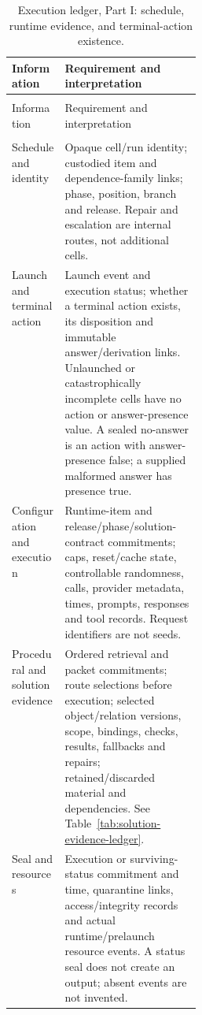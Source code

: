 \documentclass[10pt]{article} %
\providecommand{\1}{\mathbf{1}}  %
\theoremstyle{remark}
\theoremstyle{definition}
\begin{document}
\begingroup
\footnotesize
\renewcommand{\arraystretch}{1.13}
\setlength{\LTpre}{6pt}
\setlength{\LTpost}{8pt}
\setlength{\LTcapwidth}{\linewidth}
\begin{longtable}{@{}>{\raggedright\arraybackslash}p{0.28\linewidth}>{\raggedright\arraybackslash}p{}@{}}
\caption{Execution ledger, Part I: schedule, runtime evidence, and terminal-action existence.}\label{tab:execution-evaluation-ledger}\\
\toprule
Information & Requirement and interpretation \\
\midrule
\endfirsthead
\multicolumn{2}{@{}l}{\textit{Table \thetable\ continued}}\\
\toprule
Information & Requirement and interpretation \\
\midrule
\endhead
\midrule
\multicolumn{2}{r@{}}{\textit{Continued on next page}}\\
\endfoot
\bottomrule
\endlastfoot

Schedule and identity & Opaque cell/run identity; custodied item and dependence-family links; phase, position, branch and release. Repair and escalation are internal routes, not additional cells. \\
Launch and terminal action & Launch event and execution status; whether a terminal action exists, its disposition and immutable answer/derivation links. Unlaunched or catastrophically incomplete cells have no action or answer-presence value. A sealed no-answer is an action with answer-presence false; a supplied malformed answer has presence true. \\
Configuration and execution & Runtime-item and release/phase/solution-contract commitments; caps, reset/cache state, controllable randomness, calls, provider metadata, times, prompts, responses and tool records. Request identifiers are not seeds. \\
Procedural and solution evidence & Ordered retrieval and packet commitments; route selections before execution; selected object/relation versions, scope, bindings, checks, results, fallbacks and repairs; retained/discarded material and dependencies. See Table~\ref{tab:solution-evidence-ledger}. \\
Seal and resources & Execution or surviving-status commitment and time, quarantine links, access/integrity records and actual runtime/prelaunch resource events. A status seal does not create an output; absent events are not invented. \\
\end{longtable}
\endgroup
\end{document}
